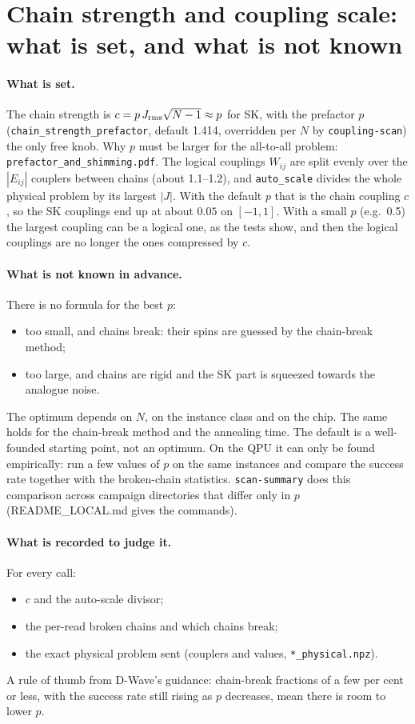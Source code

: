 \documentclass[11pt,a4paper]{article}
\newcommand{\code}[1]{\nolinkurl{#1}}
\begin{document}
\section{Chain strength and coupling scale: what is set, and what is not known}
\paragraph{What is set.} The chain strength is $c=p\,J_{\rm rms}\sqrt{N-1}\approx p$ for SK, with the prefactor $p$ (\code{chain_strength_prefactor}, default 1.414, overridden per $N$ by \code{coupling-scan}) the only free knob. Why $p$ must be larger for the all-to-all problem: \code{prefactor_and_shimming.pdf}. The logical couplings $W_{ij}$ are split evenly over the $|E_{ij}|$ couplers between chains (about 1.1--1.2), and \code{auto_scale} divides the whole physical problem by its largest $|J|$. With the default $p$ that is the chain coupling $c$, so the SK couplings end up at about $0.05$ on $[-1,1]$. With a small $p$ (e.g.\ 0.5) the largest coupling can be a logical one, as the tests show, and then the logical couplings are no longer the ones compressed by $c$.

\paragraph{What is not known in advance.} There is no formula for the best $p$:
\begin{itemize}
\item too small, and chains break: their spins are guessed by the chain-break method;
\item too large, and chains are rigid and the SK part is squeezed towards the analogue noise.
\end{itemize}
The optimum depends on $N$, on the instance class and on the chip. The same holds for the chain-break method and the annealing time. The default is a well-founded starting point, not an optimum. On the QPU it can only be found empirically: run a few values of $p$ on the same instances and compare the success rate together with the broken-chain statistics. \code{scan-summary} does this comparison across campaign directories that differ only in $p$ (README\_LOCAL.md gives the commands).

\paragraph{What is recorded to judge it.} For every call:
\begin{itemize}
\item $c$ and the auto-scale divisor;
\item the per-read broken chains and which chains break;
\item the exact physical problem sent (couplers and values, \code{*_physical.npz}).
\end{itemize}
A rule of thumb from D-Wave's guidance: chain-break fractions of a few per cent or less, with the success rate still rising as $p$ decreases, mean there is room to lower $p$.
\end{document}
